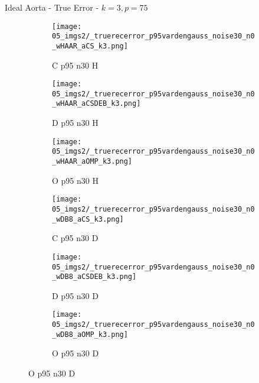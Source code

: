 \begin{frame}{Ideal Aorta - True Error - $k=3,p=75$}{}
\begin{figure}
\begin{subfigure}{0.13\textwidth}
\texttt{[image: 05\_imgs2/\_truerecerror\_p95vardengauss\_noise30\_n0\_wHAAR\_aCS\_k3.png]}
\caption*{\tiny C p95 n30 H}
\end{subfigure}
\begin{subfigure}{0.13\textwidth}
\texttt{[image: 05\_imgs2/\_truerecerror\_p95vardengauss\_noise30\_n0\_wHAAR\_aCSDEB\_k3.png]}
\caption*{\tiny D p95 n30 H}
\end{subfigure}
\begin{subfigure}{0.13\textwidth}
\texttt{[image: 05\_imgs2/\_truerecerror\_p95vardengauss\_noise30\_n0\_wHAAR\_aOMP\_k3.png]}
\caption*{\tiny O p95 n30 H}
\end{subfigure}
\begin{subfigure}{0.13\textwidth}
\texttt{[image: 05\_imgs2/\_truerecerror\_p95vardengauss\_noise30\_n0\_wDB8\_aCS\_k3.png]}
\caption*{\tiny C p95 n30 D}
\end{subfigure}
\begin{subfigure}{0.13\textwidth}
\texttt{[image: 05\_imgs2/\_truerecerror\_p95vardengauss\_noise30\_n0\_wDB8\_aCSDEB\_k3.png]}
\caption*{\tiny D p95 n30 D}
\end{subfigure}
\begin{subfigure}{0.13\textwidth}
\texttt{[image: 05\_imgs2/\_truerecerror\_p95vardengauss\_noise30\_n0\_wDB8\_aOMP\_k3.png]}
\caption*{\tiny O p95 n30 D}
\end{subfigure}
\end{figure}
\end{frame}
